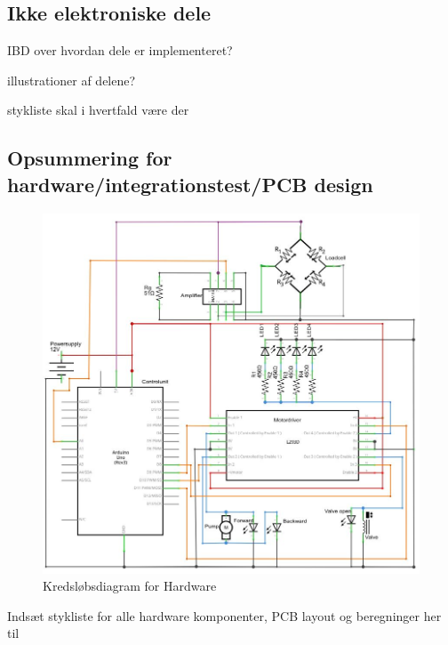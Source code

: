  
\newpage 
\subsection{Ikke elektroniske dele}

IBD over hvordan dele er implementeret?

illustrationer af delene?

stykliste skal i hvertfald være der 
 
 
 
 
\subsection{Opsummering for hardware/integrationstest/PCB design} 

\begin{figure}[H]
	\centering
	\includegraphics[width=1\textwidth]{billeder/Hardware/diagrammer/HWdiagram.JPG}
	\caption{Kredsløbsdiagram for Hardware}
	\label{fig:HWdiagram}
\end{figure}

Indsæt stykliste for alle hardware komponenter, PCB layout og beregninger her til 
 